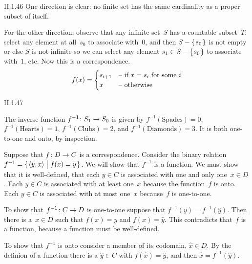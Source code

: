 %
\begin{ans}{II.1.46}
One direction is clear: no finite set has the same cardinality as a proper
subset of itself.

For the other direction, observe that any infinite set~$S$ has a countable
subset~$T$: select any element at all~$s_0$ to associate with~$0$,
and then $S-\set{s_0}$ is not empty or else $S$ is not infinite so we
can select any element $s_1\in S-\set{s_0}$ to associate with~$1$, etc.
Now this is a correspondence.
\begin{equation*}
  f(x)=
  \begin{cases}
    s_{i+1}  &\text{-- if $x=s_i$ for some $i$}  \\
    x       &\text{-- otherwise}
  \end{cases}
\end{equation*}
\end{ans}
%
\begin{ans}{II.1.47}
\begin{exparts}
\item
The inverse function
$\mbox{$f^{-1}\colon S_1\to S_0$}$ is given by
$f^{-1}(\text{Spades})=0$, $f^{-1}(\text{Hearts})=1$, $f^{-1}(\text{Clubs})=2$,
and $f^{-1}(\text{Diamonds})=3$.
It is both one-to-one and onto, by inspection.
\item Suppose that $\mbox{$f\colon D\to C$}$ is a correspondence.
Consider the binary relation
$f^{-1}=\set{\sequence{y,x}\suchthat f(x)=y}$.
We will show that $f^{-1}$ is a function.
We must show that it is well-defined, that each $y\in C$ is associated
with one and only one~$x\in D$.
Each $y\in C$ is associated with at least one~$x$ because the function~$f$
is onto.
Each $y\in C$ is associated with at most one~$x$ because~$f$ is one-to-one.
\item To show that $\mbox{$f^{-1}\colon C\to D$}$ is one-to-one suppose that
$f^{-1}(y)=f^{-1}(\hat{y})$.
Then there is a~$x\in D$ such that $f(x)=y$ and $f(x)=\hat{y}$.
This contradicts that~$f$ is a function, because a function must be
well-defined.

To show that $f^{-1}$ is onto consider a member of its codomain, $\hat{x}\in D$.
By the definion of a function there is a $\hat{y}\in C$ with
$f(\hat{x})=\hat{y}$, and then $\hat{x}=f^{-1}(\hat{y})$.
\end{exparts}
\end{ans}
%
